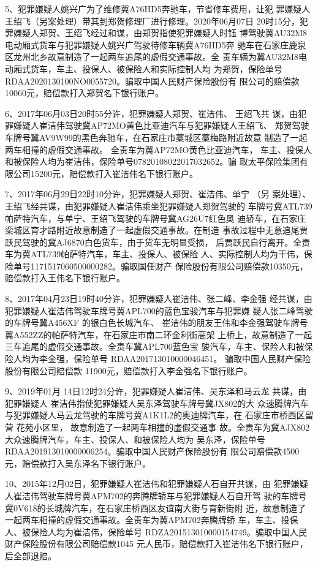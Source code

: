 5、犯罪嫌疑人姚兴广为了维修冀A76HD5奔驰车，节省修车费用，让犯
罪嫌疑人王绍飞（另案处理）带其到郑贺修理厂进行修理。2020年06月07日
20时15分，犯罪嫌疑人郑贺、王绍飞经过和谋，由郑贺指使犯罪嫌疑人时钰
博驾驶冀AU32M8电动厢式货车与犯罪嫌疑人姚兴广驾驶待修车辆冀A76HD5奔
驰车在石家庄鹿泉区龙州北乡故意制造了一起两车追尾的虚假交通事故。全
责车辆为冀AU32M8电动厢式货车，车主、投保人、被保险人和实际控制人均
为郑贺，保险单号RDAA2020130100NO0055720。骗取中国人民财产保险股份有
限公司的赔偿款10060元，赔偿款打入郑贺名下银行账户。

6、2017年06月03日20时55分许，犯罪嫌疑人郑贺、崔洁伟、 王绍飞共
谋，由犯罪嫌疑人崔洁伟驾驶冀AP72MO黄色比亚迪汽车与犯罪嫌疑人王绍飞、
郑贺驾驶车牌号冀AV9W99的黑色奔驰车，在石家庄市藁城区藁梅路附近故意
制造了一起两车相撞的虚假交通事故。 全责车为冀AP72MO黄色比亚迪汽车，
车主、投保人和被保险人均为崔洁伟，保险单号07820108022017032652。骗
取太平保险集团有限公司15200元，赔偿款打入崔洁伟名下银行账户。

7、2017年06月29日22时10分许，犯罪嫌疑人郑贺、崔洁伟、单宁 （另
案处理）、王绍飞经共谋，由犯罪嫌疑人崔洁伟乘坐犯罪嫌疑人郑贺驾驶的
车牌号冀ATL739帕萨特汽车，与单宁、王绍飞驾驶的车牌号冀AG26U7红色奥
迪轿车，在石家庄栾城区育才路附近故意制造了一起虚假交通事故。在制造
事故过程中无意追尾贾跃民驾驶的冀AJ6870白色货车，由于货车无明显受损，
后贾跃民自行离开。全责车为冀ATL739帕萨特汽车，车主、投保人、被保险
人、实际控制人均为干伟，保险单号1171517060500000282。骗取国任财产
保险股份有限公司赔偿款10350元，赔偿款打入王伟名下银行账户。

8、2017年04月23日19时40分许，犯罪嫌疑人崔洁伟、张二峰、李金强
经共谋，由犯罪嫌疑人崔洁伟驾驶车牌号冀APL700的蓝色宝骏汽车与犯罪嫌
疑人张二峰驾驶的车牌号冀A456XF 的银白色长城汽车、 崔洁伟的朋友王伟和李金强驾驶车牌号冀A552ZZ的帕萨特汽车，在石家庄市南二环金利街高架
上桥上，故意制造了一起三车追尾的虚假交通事故。全责车冀APL700蓝色宝
骏汽车，车主、保险人和被保险人均为李金强，保险单号
RDAA201713010000046451。 骗取中国人民财产保险股份有限公司赔偿款
11900元，赔偿款打入李金强名下银行账户。

9、2019年01月 14日12时24分许，犯罪嫌疑人崔洁伟、吴东泽和马云龙
共谋，由犯罪嫌疑人 崔洁伟指使犯罪嫌疑人吴东泽驾驶车牌号冀JX802的大
众速腾牌汽车与犯罪嫌疑人马云龙驾驶的车牌号冀A1K1L2的奥迪牌汽车，在
石家庄市桥西区留营 花苑小区里， 故意制造了一起两车相撞的虚假交通事
故。全责车为冀AJX802大众速腾牌汽车，车主、投保人、和被保险人均为
吴东泽，保险单号RDAA201913010000006254。骗取中国人民财产保险股份有
限公司赔偿款4500元，赔偿款打入吴东泽名下银行账户。

10、2015年12月02日，犯罪嫌疑人崔洁伟和犯罪嫌疑人石自开共谋，由
犯罪嫌疑人崔洁伟驾驶车牌号冀APM702的奔腾牌轿车与犯罪嫌疑人石自开驾
驶的车牌号冀0V618的长城牌汽车，在石家庄桥西区友谊南大街与育新街附
近，故意制造了一起两车相撞的虚假交通事故。全责车为冀APM702奔腾牌轿
车，车主、投保人、被保险人均为崔洁伟，保险单号
RDZA201513010000154749。骗取中国人民财产保险股份有限公司赔偿款1045
元人民币，赔偿款打入崔洁伟名下银行账户，后全部退赔。

